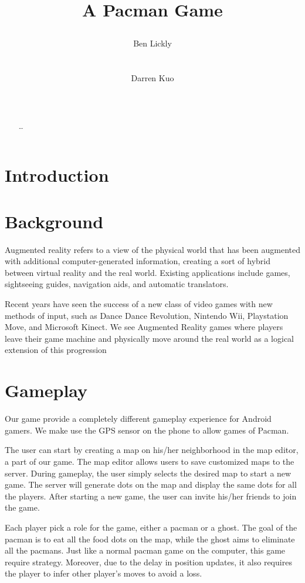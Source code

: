 \documentclass{acm_proc_article-sp}
\title{A Pacman Game
\numberofauthors{2}
\author{
\alignauthor Ben Lickly \\
       \affaddr{University of California, Berkeley}\\
       \affaddr{Berkeley, CA, USA} \\
       \email{blickly@eecs.berkeley.edu}
\alignauthor Darren Kuo \\
       \affaddr{University of California, Berkeley}\\
       \affaddr{Berkeley, CA, USA} \\
       \email{darrenkuo@eecs.berkeley.edu}
}
}
\begin{document}
\maketitle

\begin{abstract}
\ldots
\cite{ZombieRun}
\end{abstract}

\section{Introduction}
\section{Background}
Augmented reality refers to a view of the physical world that has been
augmented with additional computer-generated information, creating a
sort of hybrid between virtual reality and the real world. Existing
applications include games, sightseeing guides, navigation aids, and
automatic translators.

Recent years have seen the success of a new class of video games with
new methods of input, such as Dance Dance Revolution, Nintendo Wii,
Playstation Move, and Microsoft Kinect. We see Augmented Reality games
where players leave their game machine and physically move around the
real world as a logical extension of this progression

\section{Gameplay}
Our game provide a completely different gameplay experience for
Android gamers. We make use the GPS sensor on the phone to allow games
of Pacman.

The user can start by creating a map on his/her neighborhood in the
map editor, a part of our game. The map editor allows users to save
customized maps to the server. During gameplay, the user simply
selects the desired map to start a new game. The server will generate
dots on the map and display the same dots for all the players. After
starting a new game, the user can invite his/her friends to join the
game.

Each player pick a role for the game, either a pacman or a ghost. The
goal of the pacman is to eat all the food dots on the map, while the
ghost aims to eliminate all the pacmans. Just like a normal pacman
game on the computer, this game require strategy. Moreover, due to the
delay in position updates, it also requires the player to infer other
player's moves to avoid a loss.
\end{document}
